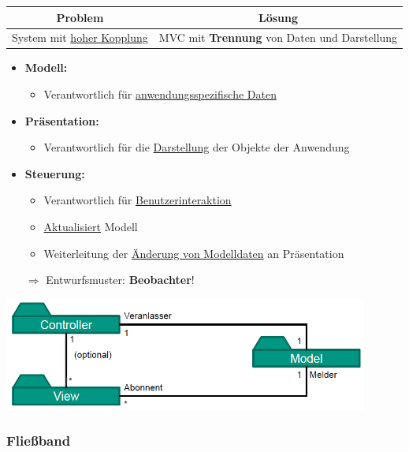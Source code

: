 \documentclass[parskip=full, 12pt]{scrartcl}
\begin{document}
				\begin{center}
					\begin{tabular}{c|c}
						\textbf{Problem} & \textbf{Lösung} \\
						\hline
						System mit \underline{hoher Kopplung} & MVC mit \textbf{Trennung} von Daten und Darstellung
					\end{tabular}
				\end{center}
			
				\begin{itemize}
					\item \textbf{Modell:}
					\begin{itemize}
						\item Verantwortlich für \underline{anwendungsspezifische Daten}
					\end{itemize}
					\item \textbf{Präsentation:}
					\begin{itemize}
						\item Verantwortlich für die \underline{Darstellung} der Objekte der Anwendung
					\end{itemize}
					\item \textbf{Steuerung:}
					\begin{itemize}
						 \item Verantwortlich für \underline{Benutzerinteraktion}
						 \item \underline{Aktualisiert} Modell
						 \item Weiterleitung der \underline{Änderung von Modelldaten} an Präsentation
					\end{itemize}
					$\Rightarrow$ Entwurfsmuster: \textbf{Beobachter}!
				\end{itemize}
	
				\begin{center}
					\includegraphics[width=0.9\textwidth]{../images/mvc.png}
				\end{center}
	
			\subsubsection{Fließband}
			
\end{document}
